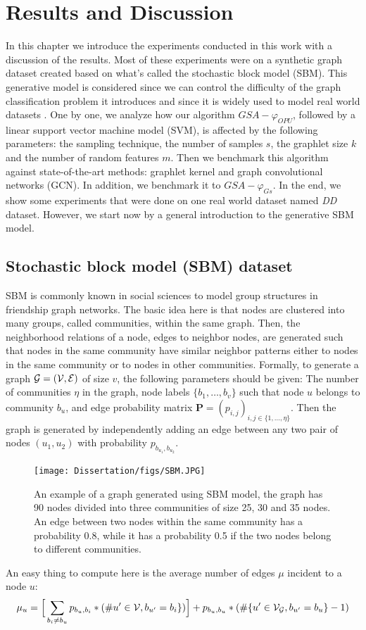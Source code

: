 \addchapheadtotoc
\chapter{Results and Discussion}
In this chapter we introduce the experiments conducted in this work  with a discussion of the results. Most of these experiments were on a synthetic graph dataset created based on what's called the stochastic block model (SBM). This generative model is considered since we can control the difficulty of the graph classification problem it introduces and since it is widely used to model real world datasets \citep{SBM}. \newline
One by one, we analyze how our algorithm $GSA-\varphi_{OPU}$, followed by a linear support vector machine model (SVM), is affected by the following parameters: the sampling technique, the number of samples $s$, the graphlet size $k$ and the number of random features $m$.
Then we benchmark this algorithm against state-of-the-art methods: graphlet kernel and graph convolutional networks (GCN). In addition, we benchmark it to $GSA-\varphi_{Gs}$.
In the end, we show some experiments that were done on one real world dataset named \emph{DD} dataset. However, we start now by a general introduction to the generative SBM model. 
\section{Stochastic block model (SBM) dataset}
SBM is commonly known in social sciences to model group structures in friendship graph networks\citep{SBM}. The basic idea here is that nodes  are clustered into many groups, called communities, within the same graph. Then, the neighborhood relations of a node, edges to neighbor nodes, are generated such that nodes in the same community have similar neighbor patterns either to nodes in the same community or to nodes in other communities. \newline
Formally, to generate a graph $\mathcal{G}=(\mathcal{V},\mathcal{E})$ of size $v$, the following parameters should be given: The number of communities $\eta$ in the graph, node labels $\{b_1 , \ldots ,b_v\}$ such that node $u$ belongs to community $b_u$, and edge probability matrix $\mathbf{P}=(p_{i,j})_{i,j\in\{1,\ldots, \eta\}}$.
Then the graph is generated by independently adding an edge between any two pair of nodes $(u_1,u_2)$ with probability $p_{b_{u_1} , b_{u_2}}$. \newline
\begin{figure}[H]
\centering
\texttt{[image: Dissertation/figs/SBM.JPG]}
\caption[Visualization of an SBM-based graph example]{An example of a graph generated using SBM model, the graph has 90 nodes divided into three communities of size 25, 30 and 35 nodes. An edge between two nodes within the same community has a probability 0.8, while it has a probability 0.5 if the two nodes belong to different communities.}
\label{fig:SBM_example}
\end{figure}
An easy thing to compute here is the average number of edges $\mu$ incident to a node $u$:
\begin{equation}
    \mu_u=\Big[\sum_{b_i\neq b_u} p_{b_u,b_i}*(\#u'\in \mathcal{V}, b_{u'}=b_i \} )\Big]+p_{b_u,b_u}*(\#\{u'\in \mathcal{V}_{\mathcal{G}}, b_{u'}=b_u \}-1 )
\end{equation}
